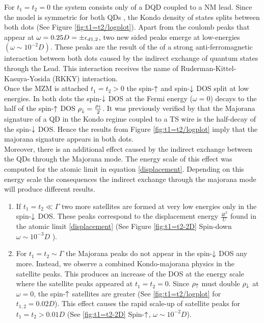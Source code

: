 \documentclass[showpacs,aps,prb,reprint,superscriptaddress]{revtex4-1}
\begin{document}
For $t_1 =t_2 = 0$ the system consists only of a DQD coupled to a NM lead. Since the model is symmetric for both QDs , the Kondo density of states  splits between both dots (See Figure \ref{fig:t1=t2/logplot}). Apart from the coulomb peaks that appear at $\omega=0.25D=\pm \epsilon_{d1,2}$, two new sided peaks emerge at low-energies $(\omega \sim 10^{-2}D)$. These peaks are the result of the of a strong anti-ferromagnetic interaction between both dots caused by the indirect exchange of quantum states through the Lead. This interaction receives the name of Ruderman-Kittel-Kasuya-Yosida (RKKY) interaction\cite{ruderman_indirect_1954,kasuya_theory_1956,yosida_magnetic_1957}. \\
    
    

Once the MZM is attached $t_1 =t_2 > 0$ the spin-$\uparrow$ and spin-$\downarrow$ DOS split at low energies. In both dots the spin-$\downarrow$ DOS at the Fermi energy ($\omega =0$) decays to the half of the spin-$\uparrow$ DOS $\rho_\downarrow = \frac{\rho_\uparrow}{2} $. It was previously verified  by  \citeauthor{ruiz-tijerina_interaction_2015} that the Majorana signature of a QD in the Kondo regime coupled to a TS wire is the half-decay of the spin-$\downarrow$ DOS. Hence the results from Figure \ref{fig:t1=t2/logplot} imply that the majorana signature appears in both dots. \\
    
Moreover, there is an additional effect caused by the indirect exchange between the QDs through the Majorana mode. The energy scale of this effect was computed for the atomic limit in equation \eqref{displacement}. Depending on this energy scale the consequences the indirect exchange through the majorana mode will produce different results.

    
\begin{enumerate}
    \item If $t_1=t_2 \ll \Gamma $ two more satellites are formed at very low energies only in the spin-$\downarrow$ DOS. These peaks correspond to the displacement energy $\frac{4t^2}{U}$ found in the atomic limit \eqref{displacement}  (See Figure \ref{fig:t1=t2-2D} Spin-down $\omega \sim 10^{-3}D$ ). 
    \item For $t_1=t_2 \sim \Gamma$ the Majorana peaks do not appear in the spin-$\downarrow$ DOS any more. Instead, we observe a combined Kondo-majorana physics in the satellite peaks. This produces an increase of the DOS at the energy scale where the satellite peaks appeared at $t_1=t_2=0$. Since $\rho_\uparrow$ must double $\rho_\downarrow$ at $\omega=0$, the spin-$\uparrow$ satellites are greater (See  \ref{fig:t1=t2/logplot} for $t_{1,2}=0.02D$). This effect causes the rapid scale-up of satellite peaks for $t_1=t_2>0.01D$  (See \ref{fig:t1=t2-2D} Spin-$\uparrow$, $\omega \sim 10^{-2}D$).
    
\end{enumerate}
    
\end{document}
